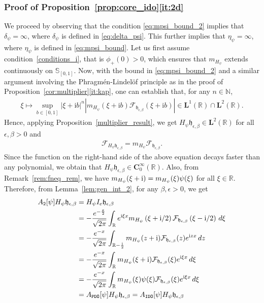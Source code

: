 \documentclass[12pt]{amsart}
\newcommand{\hptg}[2]{\hypertarget{#1}{#2}}
\numberwithin{equation}{section}
\newcommand{\bb}{\mathbb}
\newcommand{\hpt}[2]{#2}
\newcommand{\mf}{\mathfrak}
\newcommand{\ttt}{\mathtt}
\newcommand{\bmrm}[2][2]{\mathbf{#2}^{#1}}
\newcommand{\fou}{\mathcal{F}}
\newcommand{\Hpsi}{H_\psi}
\newcommand{\C}{\mathbf{C}}
\newcommand{\eps}{\epsilon}
\newcommand{\heb}{\mf{h}_{\eps,\beta}}
\renewcommand{\i}{\mathrm{i}}
\theoremstyle{definition}
\theoremstyle{assump}
\theoremstyle{remark}
\begin{document}
{\subsubsection{Proof of Proposition~\ref{prop:core_ido}\eqref{it:2d}} We proceed by observing that the condition \eqref{eq:mpsi_bound_2} implies that $\delta_\psi=\infty$, where $\delta_\psi$ is defined in \eqref{eq:delta_psi}. This further implies that $\eta_\psi=\infty$, where $\eta_\psi$ is defined in \eqref{eq:mpsi_bound}. Let us first assume condition~\eqref{conditions_i}, that is $\phi_+(0)>0$, which ensures that $m_{H_\psi}$ extends continuously on $\bb S_{[0,1]}$. Now, with the bound in \eqref{eq:mpsi_bound_2} and \hpt{R28}{a similar argument involving the Phragm\'en-Lindel\"of principle as in the proof of Proposition~\ref{cor:multiplier}\eqref{it:kap},} one can establish that, for any $n\in\bb N$,
\hptg{C69}{
\begin{align*}
	\xi\mapsto\sup_{b\in [0,1]}|\xi+\i b|^n|m_{H_\psi}(\xi+\i b)\fou_{\heb}(\xi+\i b)|\in\bmrm[1]{L}(\bb R)\cap\bmrm{L}(\bb R).
\end{align*}
}
Hence, applying Proposition~\ref{multiplier_result}, we get $H_\psi\heb\in\bmrm{L}(\bb R)$ for all $\eps,\beta>0$ and
\begin{align*}
	\fou_{H_\psi\heb}=m_{H_\psi}\fou_{\heb}.
\end{align*}
Since the function on the right-hand side of the above equation decays faster than any polynomial, we obtain that $H_\psi\heb\in\C^\infty_0(\bb R)$. Also, from Remark~\ref{rem:fneq_rem}, we have $m_{\Hpsi}(\xi+{\rm{i}})   =m_{\Hpsi}(\xi)\psi(\xi)$ for all $\xi\in\bb{R}$. Therefore, from Lemma~\ref{lem:gen_int_2}, for any $\beta,\eps>0$, we get
\begin{align}
A_\ttt{2}[\psi]\Hpsi \heb&=\Hpsi I_e \heb \nonumber \\
&=-\frac{e^{-\frac{x}{2}}}{\sqrt{2\pi}}\int_\bb{R} e^{{\rm{i}}\xi   x}m_{\Hpsi}\left(\xi+\i/2\right)\fou_{\heb}\left(\xi-\i/2\right)\,d\xi \nonumber \\
&=-\frac{e^{-x}}{\sqrt{2\pi}}\int_{\bb{R}-\frac{{\rm{i}}}{2}}m_{\Hpsi}(z+{\rm{i}})   \fou_{\heb}(z)e^{{\rm{i}}z   x}\,dz \nonumber \\
&=-\frac{e^{-x}}{\sqrt{2\pi}}\int_\bb{R} m_{\Hpsi}(\xi+{\rm{i}})   \fou_{\heb}(\xi)e^{{\rm{i}}\xi   x}\,d\xi \nonumber \\
&=-\frac{e^{-x}}{\sqrt{2\pi}}\int_{\bb{R}}m_{\Hpsi}(\xi)\psi(\xi)\fou_{\heb}(\xi)e^{{\rm{i}}\xi   x}\,d\xi \nonumber \\
&= A_\ttt{PDO}[\psi]\Hpsi\heb=A_\ttt{IDO}[\psi]\Hpsi\heb \label{eq:pdo=ido}

\end{align}}
\end{document}
